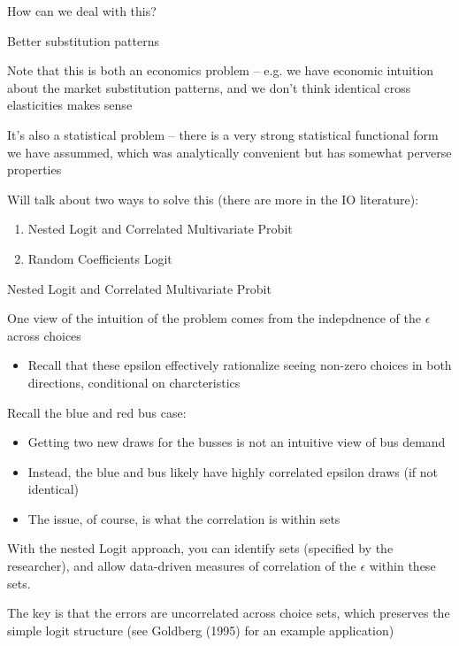 \documentclass[notes,11pt, aspectratio=169]{beamer}
\newenvironment{wideitemize}{\itemize\addtolength{\itemsep}{10pt}}{\enditemize}
\begin{document}
\begin{frame}{How can we deal with this?}
  \begin{wideitemize}
    \item Better substitution patterns

    \item Note that this is both an economics problem -- e.g. we have
    economic intuition about the market substitution patterns, and we
    don't think identical cross elasticities makes sense
    
    \item It's also a statistical problem -- there is a very strong
    statistical functional form we have assummed, which was
    analytically convenient but has somewhat perverse properties

    \item Will talk about two ways to solve this (there are more in the IO literature):
    \begin{enumerate}
    \item Nested Logit and Correlated Multivariate Probit
    \item Random Coefficients Logit
    \end{enumerate}
  \end{wideitemize}
\end{frame}

\begin{frame}{Nested Logit and Correlated Multivariate Probit}
  \begin{wideitemize}
  \item One view of the intuition of the problem comes from the
    indepdnence of the $\epsilon$ across choices
    \begin{itemize}
    \item Recall that these epsilon effectively rationalize seeing
      non-zero choices in both directions, conditional on charcteristics
    \end{itemize}
  \item Recall the blue and red bus case:
    \begin{itemize}
    \item Getting two new draws for the busses is not an intuitive
      view of bus demand
    \item Instead, the blue and bus likely have highly
      correlated epsilon draws (if not identical)
    \item The issue, of course, is what the correlation is within sets 
    \end{itemize}
  \item With the nested Logit approach, you can identify sets
    (specified by the researcher), and allow data-driven measures of
    correlation of the $\epsilon$ within these sets.
  \item The key is that the errors are uncorrelated across choice sets, which preserves
    the simple logit structure (see Goldberg (1995) for an example application)
  \end{wideitemize}
\end{frame}
\end{document}
